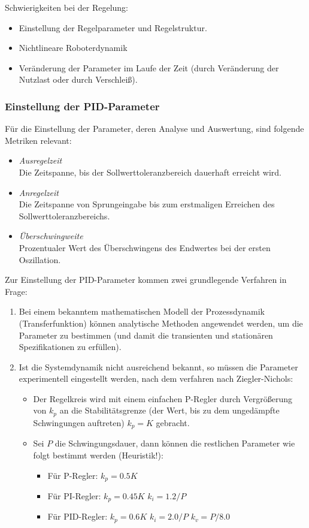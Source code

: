 			Schwierigkeiten bei der Regelung:
			\begin{itemize}
				\item Einstellung der Regelparameter und Regelstruktur.
				\item Nichtlineare Roboterdynamik
				\item Veränderung der Parameter im Laufe der Zeit (\zB durch Veränderung der Nutzlast oder durch Verschleiß).
			\end{itemize}

			\subsubsection{Einstellung der PID-Parameter}
				Für die Einstellung der Parameter, \bzw deren Analyse und Auswertung, sind folgende Metriken relevant:
				\begin{itemize}
					\item \emph{Ausregelzeit} \\ Die Zeitspanne, bis der Sollwerttoleranzbereich dauerhaft erreicht wird.
					\item \emph{Anregelzeit} \\ Die Zeitspanne von Sprungeingabe bis zum erstmaligen Erreichen des Sollwerttoleranzbereichs.
					\item \emph{Überschwingweite} \\ Prozentualer Wert des Überschwingens des Endwertes bei der ersten Oszillation.
				\end{itemize}
			
				Zur Einstellung der PID-Parameter kommen zwei grundlegende Verfahren in Frage:
				\begin{enumerate}
					\item Bei einem bekanntem mathematischen Modell der Prozessdynamik (Transferfunktion) können analytische Methoden angewendet werden, um die Parameter zu bestimmen (und damit die transienten und stationären Spezifikationen zu erfüllen).
					\item Ist die Systemdynamik nicht ausreichend bekannt, so müssen die Parameter experimentell eingestellt werden, \zB nach dem verfahren nach Ziegler-Nichols:
						\begin{itemize}
							\item Der Regelkreis wird mit einem einfachen P-Regler durch Vergrößerung von \(k_p\) an die Stabilitätsgrenze (der Wert, bis zu dem ungedämpfte Schwingungen auftreten) \( k_p = K \) gebracht.
							\item Sei \(P\) die Schwingungsdauer, dann können die restlichen Parameter wie folgt bestimmt werden (Heuristik!):
								\begin{itemize}
									\item Für P-Regler:   \tabto{3cm} \( k_p = 0.5K \)
									\item Für PI-Regler:  \tabto{3cm} \( k_p = 0.45K \) \tabto{5.5cm} \( k_i = 1.2 / P \)
									\item Für PID-Regler: \tabto{3cm} \( k_p = 0.6K \)  \tabto{5.5cm} \( k_i = 2.0 / P \) \tabto{8cm} \( k_v = P / 8.0 \)
								\end{itemize}
						\end{itemize}
				\end{enumerate}

